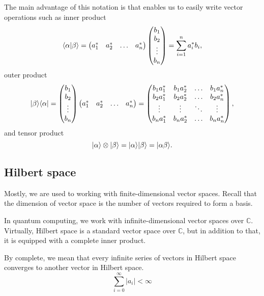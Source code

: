 The main advantage of this notation is that enables us to easily write vector operations such as inner product
$$\langle\alpha\vert\beta\rangle = \begin{pmatrix}
    a_1^* & a_2^* & \hdots & a_n^*
\end{pmatrix}\begin{pmatrix}
    b_1 \\
    b_2 \\
    \vdots \\
    b_n
\end{pmatrix} = \sum_{i=1}^{n} a_i^{*} b_i,$$ outer product
$$\lvert\beta\rangle\langle\alpha\rvert = \begin{pmatrix}
    b_1 \\
    b_2 \\
    \vdots \\
    b_n
\end{pmatrix}
\begin{pmatrix}
    a_1^* & a_2^* & \hdots & a_n^*
\end{pmatrix} = \begin{pmatrix}
    b_{1}a_1^* & b_{1}a_2^* & \hdots & b_{1}a_n^* \\
    b_{2}a_1^* & b_{2}a_2^* & \hdots & b_{2}a_n^* \\
    \vdots & \vdots & \ddots & \vdots \\
    b_{n}a_1^* & b_{n}a_2^* & \hdots & b_{n}a_n^*
\end{pmatrix},$$ and tensor product
$$\lvert\alpha\rangle \otimes \lvert\beta\rangle = \lvert\alpha\rangle\lvert\beta\rangle = \lvert\alpha \beta\rangle\text{.}$$

\subsection{Hilbert space}
Mostly, we are used to working with finite-dimensional vector spaces. Recall that the dimension of vector space is the number of vectors required to form a basis.

In quantum computing, we work with infinite-dimensional vector spaces over $\mathbb{C}$. Virtually, Hilbert space is a standard vector space over $\mathbb{C}$, but in addition to that, it is equipped with a complete inner product.

By complete, we mean that every infinite series of vectors in Hilbert space converges to another vector in Hilbert space. $$\sum_{i=0}^{\infty}\vert a_i \vert < \infty$$
\\


